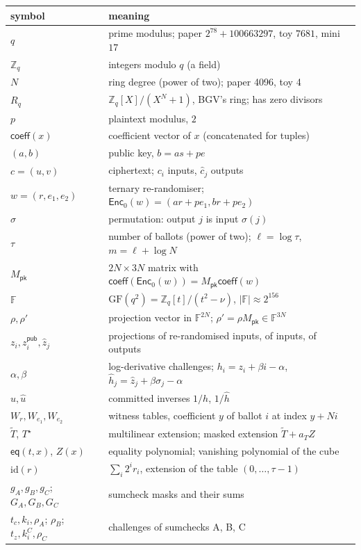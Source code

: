 \documentclass[11pt,a4paper]{article}
\newcommand{\Zq}{\mathbb{Z}_q}
\newcommand{\Rq}{R_q}
\newcommand{\F}{\mathbb{F}}
\newcommand{\eq}{\mathsf{eq}}
\newcommand{\EncZ}{\mathsf{Enc}_0}
\newcommand{\coeff}{\mathsf{coeff}}
\newcommand{\Mpk}{M_{\mathsf{pk}}}
\newcommand{\mle}[1]{\widetilde{#1}}
\newcommand{\msk}[1]{#1^{\star}}
\newcommand{\uh}{\hat{u}}
\newcommand{\hh}{\hat{h}}
\newcommand{\zh}{\hat{z}}
\newcommand{\ch}{\hat{c}}
\newcommand{\zpub}{z^{\mathsf{pub}}}
\newcommand{\id}{\mathrm{id}}
\theoremstyle{definition}
\theoremstyle{plain}
\begin{document}
\begin{longtable}{@{}p{}p{}@{}}
\toprule
symbol & meaning\\\midrule\endhead
$q$ & prime modulus; paper $2^{78}+100663297$, toy $7681$, mini $17$\\
$\Zq$ & integers modulo $q$ (a field)\\
$N$ & ring degree (power of two); paper 4096, toy 4\\
$\Rq$ & $\Zq[X]/(X^N+1)$, BGV's ring; has zero divisors\\
$p$ & plaintext modulus, $2$\\
$\coeff(x)$ & coefficient vector of $x$ (concatenated for tuples)\\
$(a,b)$ & public key, $b=as+pe$\\
$c=(u,v)$ & ciphertext; $c_i$ inputs, $\ch_j$ outputs\\
$w=(r,e_1,e_2)$ & ternary re-randomiser; $\EncZ(w)=(ar+pe_1,br+pe_2)$\\
$\sigma$ & permutation: output $j$ is input $\sigma(j)$\\
$\tau$ & number of ballots (power of two); $\ell=\log\tau$, $m=\ell+\log N$\\
$\Mpk$ & $2N\times3N$ matrix with $\coeff(\EncZ(w))=\Mpk\coeff(w)$\\
$\F$ & $\mathrm{GF}(q^2)=\Zq[t]/(t^2-\nu)$, $|\F|\approx2^{156}$\\
$\rho,\rho'$ & projection vector in $\F^{2N}$; $\rho'=\rho\Mpk\in\F^{3N}$\\
$z_i,\zpub_i,\zh_j$ & projections of re-randomised inputs, of inputs, of outputs\\
$\alpha,\beta$ & log-derivative challenges; $h_i=z_i+\beta i-\alpha$, $\hh_j=\zh_j+\beta\sigma_j-\alpha$\\
$u,\uh$ & committed inverses $1/h$, $1/\hh$\\
$W_r,W_{e_1},W_{e_2}$ & witness tables, coefficient $y$ of ballot $i$ at index $y+Ni$\\
$\mle T$, $\msk T$ & multilinear extension; masked extension $\mle T+a_TZ$\\
$\eq(t,x)$, $Z(x)$ & equality polynomial; vanishing polynomial of the cube\\
$\id(r)$ & $\sum_i2^ir_i$, extension of the table $(0,\dots,\tau-1)$\\
$g_A,g_B,g_C$; $G_A,G_B,G_C$ & sumcheck masks and their sums\\
$t_c,k_i,\rho_A$; $\rho_B$; $t_z,k^C_i,\rho_C$ & challenges of sumchecks A, B, C\\

\end{longtable}
\end{document}

